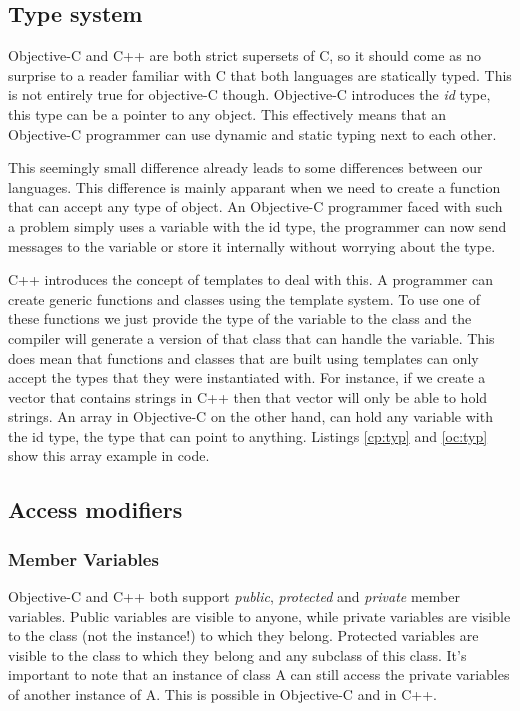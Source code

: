 \documentclass[11pt, a4paper, twocolumn]{article}
\begin{document}
\subsection{Type system}
\label{sec:types}

Objective-C and C++ are both strict supersets of C, so it should come as no surprise to a reader familiar with C that both languages are statically typed. This is not entirely true for objective-C though. Objective-C introduces the \textit{id} type, this type can be a pointer to any object. This effectively means that an Objective-C programmer can use dynamic and static typing next to each other. 

This seemingly small difference already leads to some differences between our languages. This difference is mainly apparant when we need to create a function that can accept any type of object. An Objective-C programmer faced with such a problem simply uses a variable with the id type, the programmer can now send messages to the variable or store it internally without worrying about the type.

C++ introduces the concept of templates to deal with this. A programmer can create generic functions and classes using the template system. To use one of these functions we just provide the type of the variable to the class and the compiler will generate a version of that class that can handle the variable. This does mean that functions and classes that are built using templates can only accept the types that they were instantiated with. For instance, if we create a vector that contains strings in C++ then that vector will only be able to hold strings. An array in Objective-C on the other hand, can hold any variable with the id type, the type that can point to anything. Listings \ref{cp:typ} and \ref{oc:typ} show this array example in code.

\subsection{Access modifiers}
\label{sec:access}
\subsubsection{Member Variables}
Objective-C and C++ both support \textit{public}, \textit{protected} and \textit{private} member variables. Public variables are visible to anyone, while private variables are visible to the class (not the instance!) to which they belong. Protected variables are visible to the class to which they belong and any subclass of this class. It's important to note that an instance of class A can still access the private variables of another instance of A. This is possible in Objective-C and in C++.
\end{document}
